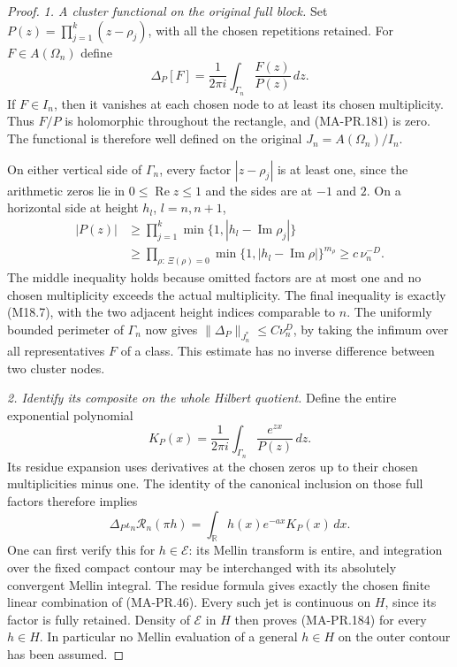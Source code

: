 \begin{proof}
\emph{1. A cluster functional on the original full block.}
Set \(P(z)=\prod_{j=1}^k(z-\rho_j)\), with all the
chosen repetitions retained.  For \(F\in A(\Omega_n)\)
define
\[
       \Delta_P[F]
          =\frac1{2\pi i}
                   \int_{\Gamma_n}\frac{F(z)}{P(z)}\,dz .
 \tag{MA-PR.181}
\]
If \(F\in I_n\), then it vanishes at each chosen
node to at least its chosen multiplicity.  Thus
\(F/P\) is holomorphic throughout the rectangle,
and (MA-PR.181) is zero.  The functional is therefore
well defined on the original \(J_n=A(\Omega_n)/I_n\).

On either vertical side of \(\Gamma_n\), every
factor \(|z-\rho_j|\) is at least one, since the
arithmetic zeros lie in \(0\le\operatorname{Re}z\le1\)
and the sides are at \(-1\) and \(2\).  On a
horizontal side at height \(h_l\), \(l=n,n+1\),
\[
 \begin{split}
 |P(z)|
 &\ge\prod_{j=1}^k
               \min\{1,|h_l-\operatorname{Im}\rho_j|\}\\
 &\ge\prod_{\rho:\,\Xi(\rho)=0}
               \min\{1,|h_l-\operatorname{Im}\rho|\}^{m_\rho}
       \ge c\,\nu_n^{-D}.
 \end{split}
 \tag{MA-PR.182}
\]
The middle inequality holds because omitted factors
are at most one and no chosen multiplicity exceeds
the actual multiplicity.  The final inequality is
exactly (M18.7), with the two adjacent height indices
comparable to \(n\).  The uniformly bounded perimeter
of \(\Gamma_n\) now gives
\(\|\Delta_P\|_{J_n^*}\le C\nu_n^D\), by taking the
infimum over all representatives \(F\) of a class.
This estimate has no inverse difference between
two cluster nodes.

\emph{2. Identify its composite on the whole Hilbert quotient.}
Define the entire exponential polynomial
\[
          K_P(x)=\frac1{2\pi i}
                    \int_{\Gamma_n}\frac{e^{zx}}{P(z)}\,dz .
 \tag{MA-PR.183}
\]
Its residue expansion uses derivatives at the chosen
zeros up to their chosen multiplicities minus one.
The identity of the canonical inclusion on those
full factors therefore implies
\[
 \Delta_P\iota_n\mathscr R_n(\pi h)
       =\int_{\mathbb R}h(x)e^{-ax}K_P(x)\,dx .
 \tag{MA-PR.184}
\]
One can first verify this for \(h\in\mathcal E\):
its Mellin transform is entire, and integration
over the fixed compact contour may be interchanged
with its absolutely convergent Mellin integral.
The residue formula gives exactly the chosen
finite linear combination of (MA-PR.46).
Every such jet is continuous on \(H\), since its
factor is fully retained.  Density of
\(\mathcal E\) in \(H\) then proves (MA-PR.184)
for every \(h\in H\).  In particular no Mellin
evaluation of a general \(h\in H\) on the outer
contour has been assumed.


\end{proof}
